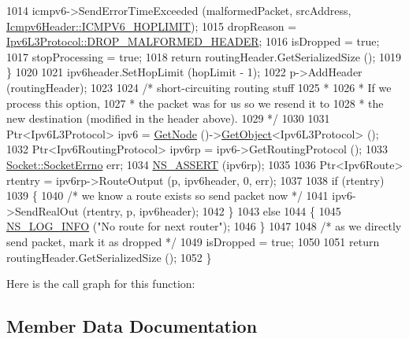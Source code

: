 \begin{DoxyCode}
1014       icmpv6->SendErrorTimeExceeded (malformedPacket, srcAddress, 
      \hyperlink{classns3_1_1Icmpv6Header_a643af752203ad4456f89d3d1ab49943aa2f477ba611ff7d0606adbca6c61e318d}{Icmpv6Header::ICMPV6\_HOPLIMIT});
1015       dropReason = \hyperlink{classns3_1_1Ipv6L3Protocol_a33c64db9bc35f71ff368b132bfffa37aaddfae41b279341b99d46df16e0d4ea7b}{Ipv6L3Protocol::DROP\_MALFORMED\_HEADER};
1016       isDropped = \textcolor{keyword}{true};
1017       stopProcessing = \textcolor{keyword}{true};
1018       \textcolor{keywordflow}{return} routingHeader.GetSerializedSize ();
1019     \}
1020 
1021   ipv6header.SetHopLimit (hopLimit - 1);
1022   p->AddHeader (routingHeader);
1023 
1024   \textcolor{comment}{/* short-circuiting routing stuff}
1025 \textcolor{comment}{   *}
1026 \textcolor{comment}{   * If we process this option,}
1027 \textcolor{comment}{   * the packet was for us so we resend it to}
1028 \textcolor{comment}{   * the new destination (modified in the header above).}
1029 \textcolor{comment}{   */}
1030 
1031   Ptr<Ipv6L3Protocol> ipv6 = \hyperlink{classns3_1_1Ipv6Extension_a71cc2e202ef7605b1f645d8c6a384657}{GetNode} ()->\hyperlink{classns3_1_1Object_a13e18c00017096c8381eb651d5bd0783}{GetObject}<Ipv6L3Protocol> ();
1032   Ptr<Ipv6RoutingProtocol> ipv6rp = ipv6->GetRoutingProtocol ();
1033   \hyperlink{classns3_1_1Socket_ada1328c5ae0c28cb2a982caf8f6d6cca}{Socket::SocketErrno} err;
1034   \hyperlink{assert_8h_a6dccdb0de9b252f60088ce281c49d052}{NS\_ASSERT} (ipv6rp);
1035 
1036   Ptr<Ipv6Route> rtentry = ipv6rp->RouteOutput (p, ipv6header, 0, err);
1037 
1038   \textcolor{keywordflow}{if} (rtentry)
1039     \{
1040       \textcolor{comment}{/* we know a route exists so send packet now */}
1041       ipv6->SendRealOut (rtentry, p, ipv6header);
1042     \}
1043   \textcolor{keywordflow}{else}
1044     \{
1045       \hyperlink{group__logging_gafbd73ee2cf9f26b319f49086d8e860fb}{NS\_LOG\_INFO} (\textcolor{stringliteral}{"No route for next router"});
1046     \}
1047 
1048   \textcolor{comment}{/* as we directly send packet, mark it as dropped */}
1049   isDropped = \textcolor{keyword}{true};
1050 
1051   \textcolor{keywordflow}{return} routingHeader.GetSerializedSize ();
1052 \}
\end{DoxyCode}


Here is the call graph for this function\+:




\subsection{Member Data Documentation}
